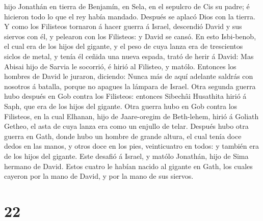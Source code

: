 hijo Jonathán en tierra de Benjamín, en Sela, en el sepulcro de Cis su
padre; é hicieron todo lo que el rey había mandado. Después se aplacó
Dios con la tierra.  Y como los Filisteos tornaron á
hacer guerra á Israel, descendió David y sus siervos con él, y pelearon
con los Filisteos: y David se cansó.  En esto Isbi-benob,
el cual era de los hijos del gigante, y el peso de cuya lanza era de
trescientos siclos de metal, y tenía él ceñida una nueva espada, trató
de herir á David:  Mas Abisai hijo de Sarvia le socorrió,
é hirió al Filisteo, y matólo. Entonces los hombres de David le juraron,
diciendo: Nunca más de aquí adelante saldrás con nosotros á batalla,
porque no apagues la lámpara de Israel.  Otra segunda
guerra hubo después en Gob contra los Filisteos: entonces Sibechâi
Husathita hirió á Saph, que era de los hijos del gigante.
 Otra guerra hubo en Gob contra los Filisteos, en la cual
Elhanan, hijo de Jaare-oregim de Beth-lehem, hirió á Goliath Getheo, el
asta de cuya lanza era como un enjullo de telar.  Después
hubo otra guerra en Gath, donde hubo un hombre de grande altura, el cual
tenía doce dedos en las manos, y otros doce en los pies, veinticuatro en
todos: y también era de los hijos del gigante.  Este
desafió á Israel, y matólo Jonathán, hijo de Sima hermano de David.
 Estos cuatro le habían nacido al gigante en Gath, los
cuales cayeron por la mano de David, y por la mano de sus siervos.

\hypertarget{section-21}{%
\section{22}\label{section-21}}

